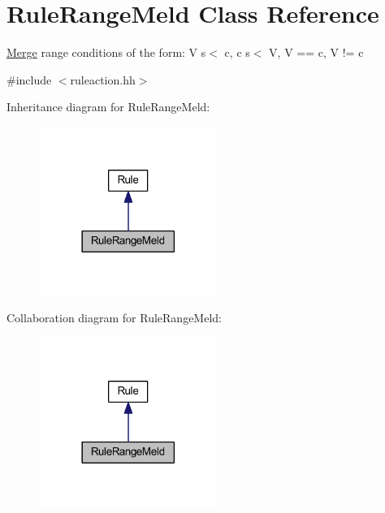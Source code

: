 \hypertarget{class_rule_range_meld}{}\section{Rule\+Range\+Meld Class Reference}
\label{class_rule_range_meld}


\mbox{\hyperlink{class_merge}{Merge}} range conditions of the form\+: {\ttfamily V s$<$ c, c s$<$ V, V == c, V != c}  




{\ttfamily \#include $<$ruleaction.\+hh$>$}



Inheritance diagram for Rule\+Range\+Meld\+:
\nopagebreak
\begin{figure}[H]
\begin{center}
\leavevmode
\includegraphics[width=165pt]{class_rule_range_meld__inherit__graph}
\end{center}
\end{figure}


Collaboration diagram for Rule\+Range\+Meld\+:
\nopagebreak
\begin{figure}[H]
\begin{center}
\leavevmode
\includegraphics[width=165pt]{class_rule_range_meld__coll__graph}
\end{center}
\end{figure}

